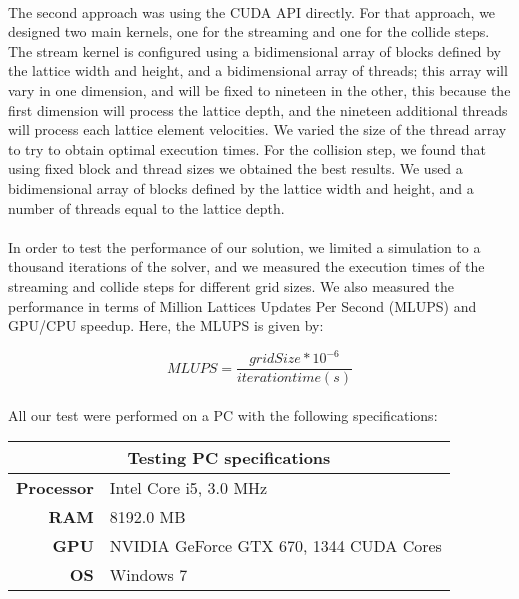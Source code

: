 \paragraph{} The second approach was using the CUDA API directly. For that approach, we designed two main kernels, one for the streaming and one for the collide steps. The stream kernel is configured using a bidimensional array of blocks defined by the lattice width and height, and a bidimensional array of threads; this array will vary in one dimension, and will be fixed to nineteen in the other, this because the first dimension will process the lattice depth, and the nineteen additional threads will process each lattice element velocities. We varied the size of the thread array to try to obtain optimal execution times. For the collision step, we found that using fixed block and thread sizes we obtained the best results. We used a bidimensional array of blocks defined by the lattice width and height, and a number of threads equal to the lattice depth. 

\paragraph{}In order to test the performance of our solution, we limited a simulation to a thousand iterations of the solver, and we measured the execution times of the streaming and collide steps for different grid sizes. We also measured the performance in terms of Million Lattices Updates Per Second (MLUPS) and GPU/CPU speedup. Here, the MLUPS is given by:

\begin{equation}
	MLUPS = \frac{grid Size * 10^{-6}}{iteration time (s)}
\end{equation}

\paragraph{}All our test were performed on a PC with the following specifications:

\begin{table}[htbp]
  \centering
    \begin{tabular}{rl}
    \toprule
    \multicolumn{2}{c}{\textbf{Testing PC specifications}} \\
    \midrule
    \textbf{Processor} & Intel Core i5, 3.0 MHz \\
    \textbf{RAM} & 8192.0 MB\\
    \textbf{GPU} & NVIDIA GeForce GTX 670, 1344 CUDA Cores\\
    \textbf{OS} & Windows 7\\
    \bottomrule
    \end{tabular}%
  \label{tab:thirdSw}%
\end{table}%

